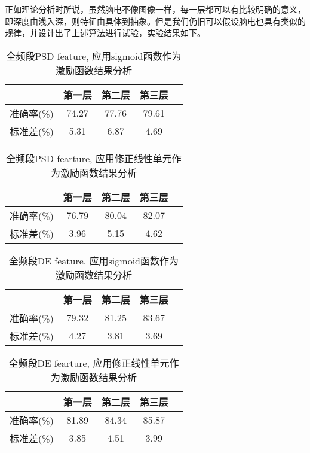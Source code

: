 	正如理论分析时所说，虽然脑电不像图像一样，每一层都可以有比较明确的意义，即深度由浅入深，则特征由具体到抽象。但是我们仍旧可以假设脑电也具有类似的规律，并设计出了上述算法进行试验，实验结果如下。\\
		\begin{table}[!h]
	\centering
\begin{tabular}{|c|c|c|c|c|}
\hline
\hline
  & 第一层 & 第二层 & 第三层 \\
\hline
准确率(\%) & 74.27 & 77.76 & 79.61\\
\hline
标准差(\%) & 5.31 & 6.87 & 4.69 \\
\hline
\end{tabular}
\caption{全频段PSD feature, 应用sigmoid函数作为激励函数结果分析}
\end{table} 

	\begin{table}[!h]
	\centering
\begin{tabular}{|c|c|c|c|c|}
\hline
\hline
  & 第一层 & 第二层 & 第三层 \\
\hline
准确率(\%) & 76.79 & 80.04 & 82.07\\
\hline
标准差(\%) & 3.96 & 5.15 & 4.62 \\
\hline
\end{tabular}
\caption{全频段PSD fearture, 应用修正线性单元作为激励函数结果分析}
\end{table} 


	\begin{table}[!h]
	\centering
\begin{tabular}{|c|c|c|c|c|}
\hline
\hline
  & 第一层 & 第二层 & 第三层 \\
\hline
准确率(\%) & 79.32 & 81.25 & 83.67\\
\hline
标准差(\%) & 4.27 & 3.81 & 3.69 \\
\hline
\end{tabular}
\caption{全频段DE feature, 应用sigmoid函数作为激励函数结果分析}
\end{table} 

	\begin{table}[!h]
	\centering
\begin{tabular}{|c|c|c|c|c|}
\hline
\hline
  & 第一层 & 第二层 & 第三层 \\
\hline
准确率(\%) & 81.89 & 84.34 & 85.87\\
\hline
标准差(\%) & 3.85 & 4.51 & 3.99 \\
\hline
\end{tabular}
\caption{全频段DE fearture, 应用修正线性单元作为激励函数结果分析}
\end{table} 

